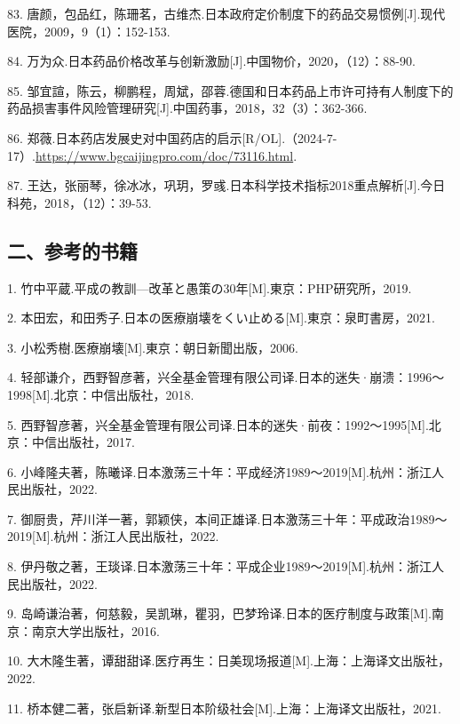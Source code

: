83. 唐颜，包品红，陈珊茗，古维杰.日本政府定价制度下的药品交易惯例[J].现代医院，2009，9（1）：152-153.

84. 万为众.日本药品价格改革与创新激励[J].中国物价，2020，（12）：88-90.

85. 邹宜諠，陈云，柳鹏程，周斌，邵蓉.德国和日本药品上市许可持有人制度下的药品损害事件风险管理研究[J].中国药事，2018，32（3）：362-366.

86. 郑薇.日本药店发展史对中国药店的启示[R/OL].\allowbreak{}（2024-7-17）.\url{https://www.bgcaijingpro.com/doc/73116.html}.

87. 王达，张丽琴，徐冰冰，巩玥，罗彧.日本科学技术指标2018重点解析[J].今日科苑，2018，（12）：39-53.

\subsection{二、参考的书籍}

1. 竹中平蔵.平成の教訓—改革と愚策の30年[M].東京：PHP研究所，2019.

2. 本田宏，和田秀子.日本の医療崩壊をくい止める[M].東京：泉町書房，2021.

3. 小松秀樹.医療崩壊[M].東京：朝日新聞出版，2006.

4. 轻部谦介，西野智彦著，兴全基金管理有限公司译.日本的迷失·崩溃：1996～1998[M].北京：中信出版社，2018.

5. 西野智彦著，兴全基金管理有限公司译.日本的迷失·前夜：1992～1995[M].北京：中信出版社，2017.

6. 小峰隆夫著，陈曦译.日本激荡三十年：平成经济1989～2019[M].杭州：浙江人民出版社，2022.

7. 御厨贵，芹川洋一著，郭颖侠，本间正雄译.日本激荡三十年：平成政治1989～2019[M].杭州：浙江人民出版社，2022.

8. 伊丹敬之著，王琰译.日本激荡三十年：平成企业1989～2019[M].杭州：浙江人民出版社，2022.

9. 岛崎谦治著，何慈毅，吴凯琳，瞿羽，巴梦玲译.日本的医疗制度与政策[M].南京：南京大学出版社，2016.

10. 大木隆生著，谭甜甜译.医疗再生：日美现场报道[M].上海：上海译文出版社，2022.

11. 桥本健二著，张启新译.新型日本阶级社会[M].上海：上海译文出版社，2021.
